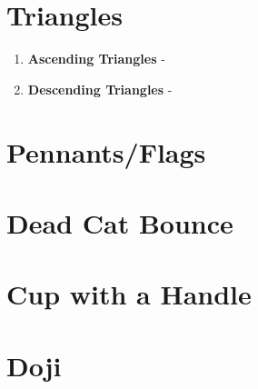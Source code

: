 \section{Triangles}
\begin{enumerate}
\item \textbf{Ascending Triangles} - 
\item \textbf{Descending Triangles} - 
\end{enumerate}

\section{Pennants/Flags}

\section{Dead Cat Bounce}

\section{Cup with a Handle}

\section{Doji}
\par 
\par 
\par 
%

